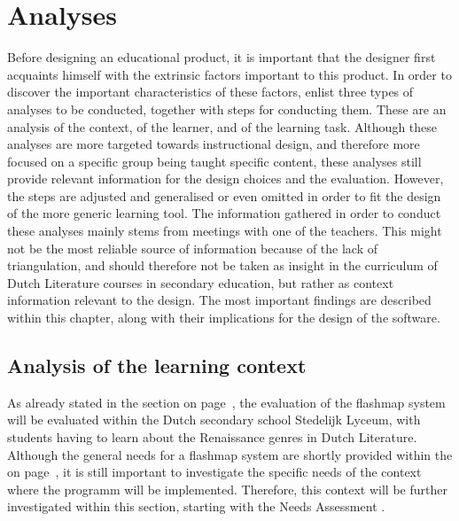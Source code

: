 \chapter{Analyses}

\label{ch:analysis}

Before designing an educational product, it is important that the designer first acquaints himself with the extrinsic factors important to this product. In order to discover the important characteristics of these factors,  enlist three types of analyses to be conducted, together with steps for conducting them. These are an analysis of the context, of the learner, and of the learning task. Although these analyses are more targeted towards instructional design, and therefore more focused on a specific group being taught specific content, these analyses still provide relevant information for the design choices and the evaluation. However, the steps are adjusted and generalised or even omitted in order to fit the design of the more generic learning tool. The information gathered in order to conduct these analyses mainly stems from meetings with one of the teachers. This might not be the most reliable source of information because of the lack of triangulation, and should therefore not be taken as insight in the curriculum of Dutch Literature courses in secondary education, but rather as context information relevant to the design. The most important findings are described within this chapter, along with their implications for the design of the software.

\section{Analysis of the learning context}
\label{sec:contextanalysis}

As already stated in the  section on page~\pageref{sec:intro_evaluation}, the evaluation of the flashmap system will be evaluated within the Dutch secondary school Stedelijk Lyceum, with students having to learn about the Renaissance genres in Dutch Literature. Although the general needs for a flashmap system are shortly provided within the  on page~\pageref{sec:intro_evaluation}, it is still important to investigate the specific needs of the context where the programm will be implemented. Therefore, this context will be further investigated within this section, starting with the Needs Assessment \cite{instructionaldesign}. 


